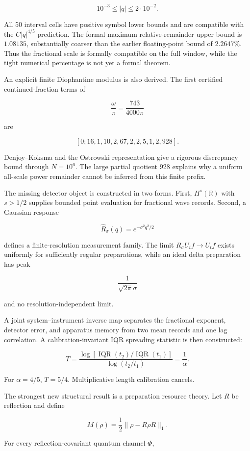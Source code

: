 \documentclass[11pt,a4paper,openany]{report}
\begin{document}
\[
10^{-3}\le |q|\le2\cdot10^{-2}.
\]

All 50 interval cells have positive symbol lower bounds and are compatible with the \(C|q|^{4/5}\) prediction. The formal maximum relative-remainder upper bound is \(1.08135\), substantially coarser than the earlier floating-point bound of \(2.2647\%\). Thus the fractional scale is formally compatible on the full window, while the tight numerical percentage is not yet a formal theorem.

An explicit finite Diophantine modulus is also derived. The first certified continued-fraction terms of

\[
\frac{\omega}{\pi}
=
\frac{743}{4000\pi}
\]

are

\[
[0;16,1,10,2,67,2,2,5,1,2,928].
\]

Denjoy--Koksma and the Ostrowski representation give a rigorous discrepancy bound through \(N=10^6\). The large partial quotient \(928\) explains why a uniform all-scale power remainder cannot be inferred from this finite prefix.

The missing detector object is constructed in two forms. First, \(H^s(\mathbb R)\) with \(s>1/2\) supplies bounded point evaluation for fractional wave records. Second, a Gaussian response

\[
\widehat R_\sigma(q)=e^{-\sigma^2q^2/2}
\]

defines a finite-resolution measurement family. The limit \(R_\sigma U_tf\to U_tf\) exists uniformly for sufficiently regular preparations, while an ideal delta preparation has peak

\[
\frac1{\sqrt{2\pi}\sigma}
\]

and no resolution-independent limit.

A joint system--instrument inverse map separates the fractional exponent, detector error, and apparatus memory from two mean records and one lag correlation. A calibration-invariant IQR spreading statistic is then constructed:

\[
T
=
\frac{
\log\left[\operatorname{IQR}(t_2)/\operatorname{IQR}(t_1)\right]
}{
\log(t_2/t_1)
}
=\frac1\alpha.
\]

For \(\alpha=4/5\), \(T=5/4\). Multiplicative length calibration cancels.

The strongest new structural result is a preparation resource theory. Let \(R\) be reflection and define

\[
M(\rho)
=
\frac12\|\rho-R\rho R\|_1.
\]

For every reflection-covariant quantum channel \(\Phi\),
\end{document}
